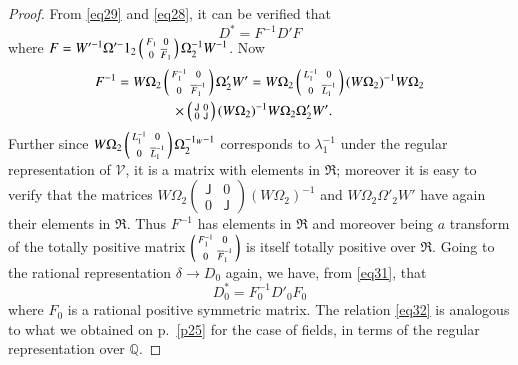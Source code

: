 \begin{proof}
From \eqref{eq29} and \eqref{eq28}, it can be verified that
\begin{equation*}
D^{\ast} = F^{-1} D' F \tag{31}\label{eq31}
\end{equation*}
where $F=W'^{-1} \Omega'^-{1}_2
\left(\begin{smallmatrix} F_1 & 0 \\ 0 &
  \overline{F}_1 \end{smallmatrix}\right) \Omega^{-1}_2 W^{-1}
$. Now 
\begin{align*}
F^{-1} &= W \Omega_2
\left(\begin{smallmatrix} F^{-1}_{1} & 0 \\ 0 &
  \overline{F}^{-1}_1\end{smallmatrix}\right)  \Omega'_2 W' = W \Omega_2 
\left(\begin{smallmatrix} L^{-1}_1 & 0 \\0 &
  \overline{L}^{-1}_1\end{smallmatrix}\right) (W\Omega_2)^{-1} W \Omega_2\\
&\qquad\qquad\times 
\left(\begin{smallmatrix} \mathsf{J} & 0 \\ 0 &
  \mathsf{J} \end{smallmatrix}\right) (W\Omega_2)^{-1} W \Omega_2
\Omega'_2 W'.
\end{align*}
Further since $W\Omega_2
\left(\begin{smallmatrix} L^{-1}_1 & 0 \\ 0 &
  \overline{L}^{-1}_1 \end{smallmatrix}\right) \Omega^{-1_W -1}_2 $
corresponds to $\lambda^{-1}_1$ under the regular representation of
$\mathscr{V}$, it is a matrix with elements in $\mathfrak{R}$;
moreover it is easy to verify that the matrices $W\Omega_2
\left(\begin{smallmatrix} \mathsf{J} & 0 \\ 0 &
  \mathsf{J} \end{smallmatrix}\right) (W\Omega_2)^{-1}$ and $W\Omega_2
\Omega'_2W'$ have again their elements in $\mathfrak{R}$. Thus
$F^{-1}$ has elements in $\mathfrak{R}$ and moreover being $a$
transform of the totally positive matrix
$\left(\begin{smallmatrix} F^{-1}_1 & 0 \\ 0 &
  \overline{F}^{-1}_1 \end{smallmatrix}\right)$ is itself totally positive
over $\mathfrak{R}$. Going to the rational representation
\pageoriginale $\delta \rightarrow D_0$ again, we have, from \eqref{eq31},
that 
\begin{equation*}
D^{\ast}_0 = F^{-1}_0 D'_0 F_0 \tag{32}\label{eq32}
\end{equation*}
where $F_0$ is a rational positive symmetric matrix. The relation \eqref{eq32}
is analogous to what we obtained on p.~\ref{p25} for the case of fields, in
terms of the regular representation over $\mathbb{Q}$. 


\end{proof}
